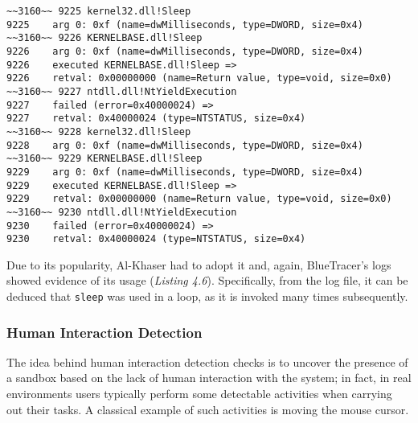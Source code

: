 \vspace{0.5cm}
\begin{lstlisting}[caption={Portion of \texttt{Sleep} loop },captionpos=b]
~~3160~~ 9225 kernel32.dll!Sleep
9225 	arg 0: 0xf (name=dwMilliseconds, type=DWORD, size=0x4)
~~3160~~ 9226 KERNELBASE.dll!Sleep
9226 	arg 0: 0xf (name=dwMilliseconds, type=DWORD, size=0x4)
9226    executed KERNELBASE.dll!Sleep =>
9226 	retval: 0x00000000 (name=Return value, type=void, size=0x0)
~~3160~~ 9227 ntdll.dll!NtYieldExecution
9227    failed (error=0x40000024) =>
9227 	retval: 0x40000024 (type=NTSTATUS, size=0x4)
~~3160~~ 9228 kernel32.dll!Sleep
9228 	arg 0: 0xf (name=dwMilliseconds, type=DWORD, size=0x4)
~~3160~~ 9229 KERNELBASE.dll!Sleep
9229 	arg 0: 0xf (name=dwMilliseconds, type=DWORD, size=0x4)
9229    executed KERNELBASE.dll!Sleep =>
9229 	retval: 0x00000000 (name=Return value, type=void, size=0x0)
~~3160~~ 9230 ntdll.dll!NtYieldExecution
9230    failed (error=0x40000024) =>
9230 	retval: 0x40000024 (type=NTSTATUS, size=0x4)
\end{lstlisting}

Due to its popularity, Al-Khaser had to adopt it and, again, BlueTracer's logs showed evidence of its usage (\textit{Listing 4.6}). Specifically, from the log file, it can be deduced that \texttt{sleep} was used in a loop, as it is invoked many times subsequently.

\subsubsection*{Human Interaction Detection}

The idea behind human interaction detection checks is to uncover the presence of a sandbox based on the lack of human interaction with the system; in fact, in real environments users typically perform some detectable activities when carrying out their tasks. A classical example of such activities is moving the mouse cursor.  

